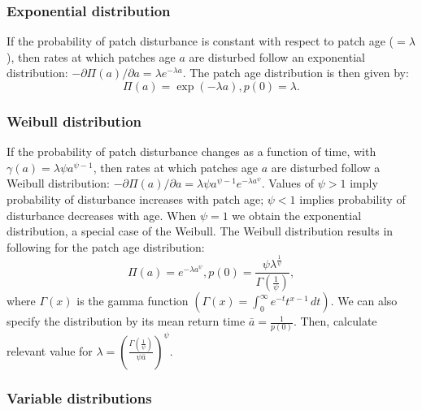 \documentclass[10pt,twoside]{article}
\begin{document}
\subsubsection{Exponential distribution}\label{exponential-distribution}

If the probability of patch disturbance is constant with respect to
patch age (\(=\lambda\)), then rates at which patches age \(a\) are
disturbed follow an exponential distribution:
\(-\partial \Pi(a)/ \partial a = \lambda e^{-\lambda a}\). The patch age
distribution is then given by:
\[ \Pi(a) = \exp\left(-\lambda a\right), p(0) = \lambda.\]

\subsubsection{Weibull distribution}\label{weibull-distribution}

If the probability of patch disturbance changes as a function of time,
with \(\gamma(a) = \lambda \psi a^{\psi-1}\), then rates at which
patches age \(a\) are disturbed follow a Weibull distribution:
\(-\partial \Pi(a)/ \partial a = \lambda \psi a^{\psi -1}e^{-\lambda a^\psi}\).
Values of \(\psi>1\) imply probability of disturbance increases with
patch age; \(\psi<1\) implies probability of disturbance decreases with
age. When \(\psi=1\) we obtain the exponential distribution, a special
case of the Weibull. The Weibull distribution results in following for
the patch age distribution:
\[\Pi(a) = e^{-\lambda a^\psi}, p(0) =  \frac{\psi \lambda^{\frac1{\psi}}}{\Gamma\left(\frac1{\psi}\right)},\]
where \(\Gamma(x)\) is the gamma function
\(\left(\Gamma(x) = \int_{0}^{\infty}e^{-t}t^{x-1}\, dt\right)\). We can
also specify the distribution by its mean return time
\(\bar{a} = \frac1{p(0)}\). Then, calculate relevant value for
\(\lambda = \left(\frac{\Gamma\left(\frac1{\psi}\right)}{\psi \bar{a}}\right)^{\psi}\).

\subsubsection{Variable distributions}\label{variable-distributions}
\end{document}
